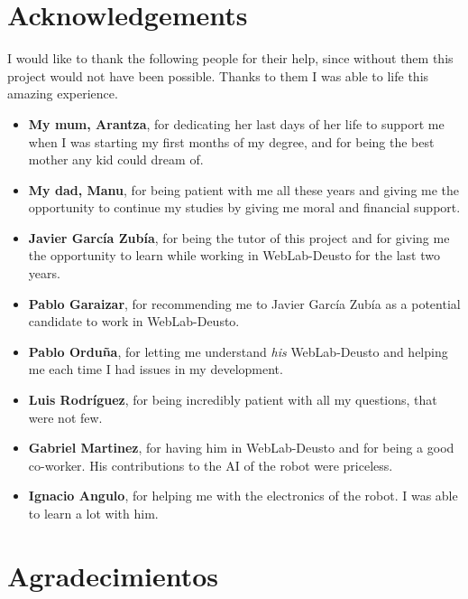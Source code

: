 \chapter*{Acknowledgements}

I would like to thank the following people for their help, since without them this project would not
have been possible. Thanks to them I was able to life this amazing experience.

\begin{itemize}
	\item \textbf{My mum, Arantza}, for dedicating her last days of her life to support me when I
	was starting my first months of my degree, and for being the best mother any kid could dream of.

	\item \textbf{My dad, Manu}, for being patient with me all these years and giving me the
	opportunity to continue my studies by giving me moral and financial support.

	\item \textbf{Javier García Zubía}, for being the tutor of this project and for giving me the
	opportunity to learn while working in WebLab-Deusto for the last two years.

	\item \textbf{Pablo Garaizar}, for recommending me to Javier García Zubía as a
	potential candidate to work in WebLab-Deusto.

	\item \textbf{Pablo Orduña}, for letting me understand \textit{his} WebLab-Deusto and helping me
	each time I had issues in my development.

	\item \textbf{Luis Rodríguez}, for being incredibly patient with all my questions, that were not
	few.

	\item \textbf{Gabriel Martinez}, for having him in WebLab-Deusto and for being a good co-worker.
	His contributions to the AI of the robot were priceless.

	\item \textbf{Ignacio Angulo}, for helping me with the electronics of the robot. I was able to
	learn a lot with him.
\end{itemize}

\chapter*{Agradecimientos}

